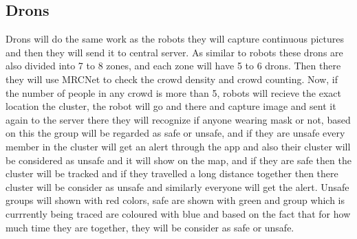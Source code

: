 \documentclass[10pt,twocolumn,letterpaper]{article}
\begin{document}
\subsection{Drons}
Drons will do the same work as the robots they will capture continuous pictures and then they will send it to central server. As similar to robots these drons are also divided into 7 to 8 zones, and each zone will have 5 to 6 drons. Then there they will use MRCNet to check the crowd density and crowd counting. Now, if the number of people in any crowd is more than 5, robots will recieve the exact location the cluster, the robot will go and there and capture image and sent it again to the server there they will recognize if anyone wearing mask or not, based on this the group will be regarded as safe or unsafe, and if they are unsafe every member in the cluster will get an alert through the app and also their cluster will be considered as unsafe and it will show on the map, and if they are safe then the cluster will be tracked and if they travelled a long distance together then there cluster will be consider as unsafe and similarly everyone will get the alert.
Unsafe groups will shown with red colors, safe are shown with green and group which is currrently being traced are coloured with blue and based on the fact that for how much time they are together, they will be consider as safe or unsafe.
\\
\end{document}
